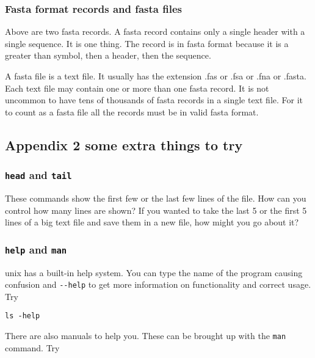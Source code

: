\documentclass[11pt]{article}
\begin{document}
\hypertarget{fasta-format-records-and-fasta-files}{%
\subsubsection{Fasta format records and fasta
files}\label{fasta-format-records-and-fasta-files}}

Above are two fasta records. A fasta record contains only a single
header with a single sequence. It is one thing. The record is in fasta
format because it is a greater than symbol, then a header, then the
sequence.

A fasta file is a text file. It usually has the extension .fas or .fsa
or .fna or .fasta. Each text file may contain one or more than one fasta
record. It is not uncommon to have tens of thousands of fasta records in
a single text file. For it to count as a fasta file all the records must
be in valid fasta format.

    \hypertarget{appendix-2-some-extra-things-to-try}{%
\subsection{Appendix 2 some extra things to
try}\label{appendix-2-some-extra-things-to-try}}

\hypertarget{head-and-tail}{%
\subsubsection{\texorpdfstring{\texttt{head} and
\texttt{tail}}{head and tail}}\label{head-and-tail}}

These commands show the first few or the last few lines of the file. How
can you control how many lines are shown? If you wanted to take the last
5 or the first 5 lines of a big text file and save them in a new file,
how might you go about it?

\hypertarget{help-and-man}{%
\subsubsection{\texorpdfstring{\texttt{help} and
\texttt{man}}{help and man}}\label{help-and-man}}

unix has a built-in help system. You can type the name of the program
causing confusion and \texttt{-\/-help} to get more information on
functionality and correct usage. Try

\texttt{ls\ -help}

There are also manuals to help you. These can be brought up with the
\texttt{man} command. Try
\end{document}

